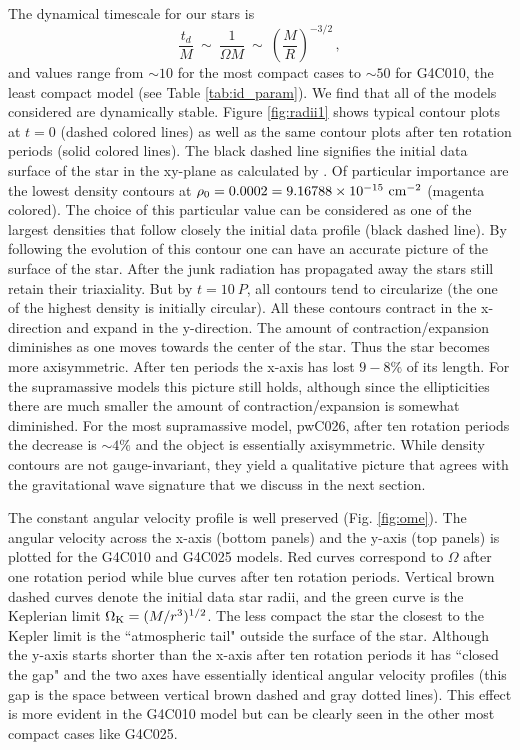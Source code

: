 \documentclass[twocolumn,superscriptaddress,showpacs,prd,aps,amsmath,amssymb,nofootinbib]{revtex4-1}
\newcommand{\GR}{\rho}
\newcommand{\tdoMmin}{(t_d/M)_{\rm min}}
\begin{document}
The dynamical timescale for our stars is 
\begin{equation}
\frac{t_d}{M}\ \sim\ \frac{1}{\Omega M} \ \sim\ 
\left(\frac{M}{R}\right)^{-3/2}\, ,  %
\label{eq:td}
\end{equation}
and values range from $\sim 10$ for the most compact cases to $\sim 50$ 
for  G4C010, the least compact model (see Table \ref{tab:id_param}). 
We find that all of the models considered are dynamically stable. Figure
\ref{fig:radii1} shows typical contour plots at $t=0$ (dashed colored
lines) as well as the same contour plots after ten rotation periods
(solid colored lines).
The black dashed line signifies the initial
data surface of the star in the xy-plane as calculated by \cocal{}.
Of particular importance are the lowest density contours at
$\GR_0=0.0002=9.16788\times 10^{-15}\ {\rm cm^{-2}}$ (magenta
colored).  The choice of this particular value can be considered as 
one of the largest densities that follow closely the initial data
profile (black dashed line).
By following the evolution
of this contour one can have an accurate picture of the surface of the
star.  After the junk radiation has propagated away the stars still
retain their triaxiality. But by $t=10\ P$, all contours tend to
circularize (the one of the highest density is initially circular).
All these contours contract in the x-direction and expand in the
y-direction. The amount of contraction/expansion diminishes as one
moves towards the center of the star. Thus the star becomes more
axisymmetric. After ten periods the x-axis has lost $9-8\%$ of its
length. For the supramassive models this picture still holds, although
since the ellipticities there are much smaller the amount of
contraction/expansion is somewhat diminished. For the most
supramassive model, pwC026, after ten rotation periods the decrease is
$\sim 4\%$ and the object is essentially axisymmetric.
While density contours are not gauge-invariant,
they yield a qualitative picture that agrees with the gravitational 
wave signature that we discuss in the next section.

The constant angular velocity profile is well preserved (Fig.
\ref{fig:ome}). The angular velocity across the x-axis (bottom panels)
and the y-axis (top panels) is plotted for the G4C010 and G4C025
models. Red curves correspond to $\Omega$ after one rotation period
while blue curves after ten rotation periods. Vertical brown dashed
curves denote the initial data star radii, and the green curve is the
Keplerian limit $\Omega_{\rm K}=(M/r^3)^{1/2}$.  The less compact the
star the closest to the Kepler limit is the ``atmospheric tail"
outside the surface of the star. Although the y-axis starts shorter
than the x-axis after ten rotation periods it has ``closed the gap"
and the two axes have essentially identical angular velocity profiles
(this gap is the space between vertical brown dashed and gray dotted
lines).  This effect is more evident in the G4C010 model but can be
clearly seen in the other most compact cases like G4C025.
\end{document}
